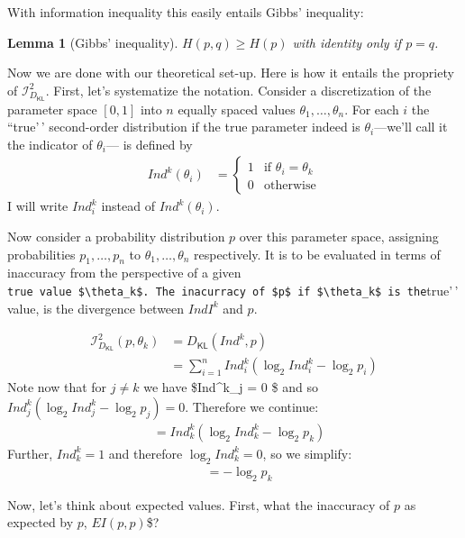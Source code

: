 \documentclass[
  10pt,
  dvipsnames,enabledeprecatedfontcommands]{scrartcl}
\newcommand{\dkl}{D_{\mathsf{KL}}} %
\newtheorem{lemma}{Lemma}
\begin{document}
With information inequality this easily entails Gibbs' inequality:

\begin{lemma}[Gibbs' inequality] $H(p,q) \geq H(p)$ with identity only if $p = q$.
\end{lemma}

Now we are done with our theoretical set-up. Here is how it entails the
propriety of \(\mathcal{I}_{\dkl}^2\). First, let's systematize the
notation. Consider a discretization of the parameter space \([0,1]\)
into \(n\) equally spaced values \(\theta_1, \dots, \theta_n\). For each
\(i\) the ``true'\,' second-order distribution if the true parameter
indeed is \(\theta_i\)---we'll call it the indicator of \(\theta_i\)---
is defined by \begin{align*}
Ind^k(\theta_i) & = \begin{cases} 1 & \mbox{if } \theta_i = \theta_k\\
                        0 & \mbox{otherwise}  \end{cases}
\end{align*} \noindent I will write \(Ind^k_i\) instead of
\(Ind^k(\theta_i)\).

Now consider a probability distribution \(p\) over this parameter space,
assigning probabilities \(p_1, \dots, p_n\) to
\(\theta_1, \dots, \theta_n\) respectively. It is to be evaluated in
terms of inaccuracy from the perspective of a given
\texttt{true\textquotesingle{}\textquotesingle{}\ value\ \$\textbackslash{}theta\_k\$.\ The\ inacurracy\ of\ \$p\$\ if\ \$\textbackslash{}theta\_k\$\ is\ the}true'\,'
value, is the divergence between \(IndI^k\) and \(p\).

\begin{align*}
\mathcal{I}_{\dkl}^2(p, \theta_k) & = \dkl(Ind^k,p) \\
& = \sum_{i=1}^n Ind^k_i \left( \log_2 Ind^k_i - \log_2 p_i \right)
\end{align*} Note now that for \(j \neq k\) we have \$Ind\^{}k\_j = 0 \$
and so \(Ind^k_j \left( \log_2 Ind^k_j - \log_2 p_j \right)=0\).
Therefore we continue: \begin{align*}
& = Ind^k_k \left( \log_2 Ind^k_k - \log_2 p_k \right)
\end{align*} Further, \(Ind^k_k= 1\) and therefore
\(\log_2 Ind^k_k =0\), so we simplify: \begin{align*}
& =  - \log_2 p_k
\end{align*}

\noindent Now, let's think about expected values. First, what the
inaccuracy of \(p\) as expected by \(p\), \(EI(p,p)\)\$?
\end{document}
